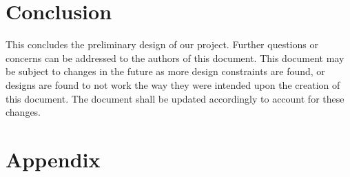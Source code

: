 \documentclass[letterpaper,10pt]{article}
\begin{document}
\section{Conclusion}
This concludes the preliminary design of our project. Further questions or concerns can be addressed to the authors of this document.
This document may be subject to changes in the future as more design constraints are found, or designs are found to not work the way
they were intended upon the creation of this document. The document shall be updated accordingly to account for these changes.

\clearpage
\printglossary[numberedsection]

\section{Appendix}

\end{document}

